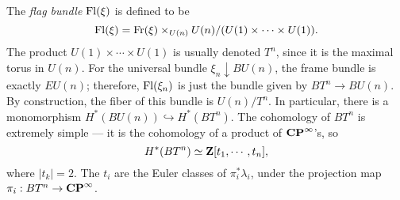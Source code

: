 The \emph{flag bundle} $\mathrm{Fl}(\xi)$ is defined to be
$$\mathrm{Fl}(\xi) = \mathrm{Fr}(\xi)\times_{U(n)} U(n)/(U(1)\times\cdots\times U(1)).$$
The product $U(1)\times\cdots\times U(1)$ is usually denoted $T^n$, since it is
the maximal torus in $U(n)$. For the universal bundle $\xi_n\downarrow BU(n)$,
the frame bundle is exactly $EU(n)$; therefore, $\mathrm{Fl}(\xi_n)$ is just the bundle
given by $BT^n\to BU(n)$. By construction, the fiber of this bundle is
$U(n)/T^n$. In particular, there is a monomorphism $H^\ast(BU(n))
\hookrightarrow H^\ast(BT^n)$. The cohomology of $BT^n$ is extremely simple ---
it is the cohomology of a product of $\mathbf{CP}^\infty$'s, so
$$H^\ast(BT^n) \simeq \mathbf Z[t_1,\cdots,t_n],$$
where $|t_k| = 2$. The $t_i$ are the Euler classes of $\pi_i^\ast\lambda_i$,
under the projection map $\pi_i:BT^n\to\mathbf{CP}^\infty$.
